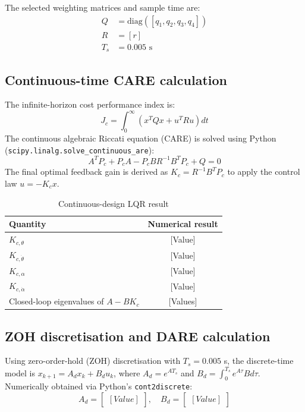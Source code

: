\documentclass[12pt,a4paper]{article}
\begin{document}
The selected weighting matrices and sample time are:
\begin{align*}
    Q &= \text{diag}([q_1, q_2, q_3, q_4]) \\
    R &= [r] \\
    T_s &= 0.005 \text{ s}
\end{align*}

\subsection{Continuous-time CARE calculation}
The infinite-horizon cost performance index is:
\begin{equation}
    J_c = \int_0^\infty (x^T Q x + u^T R u) dt
\end{equation}
The continuous algebraic Riccati equation (CARE) is solved using Python (\texttt{scipy.linalg.solve\_continuous\_are}):
\begin{equation}
    A^T P_c + P_c A - P_c B R^{-1} B^T P_c + Q = 0
\end{equation}
The final optimal feedback gain is derived as $K_c = R^{-1} B^T P_c$ to apply the control law $u = -K_c x$.

\begin{table}[h!]
    \centering
    \caption{Continuous-design LQR result}
    \begin{tabular}{lc}
        \toprule
        \textbf{Quantity} & \textbf{Numerical result} \\
        \midrule
        $K_{c,\theta}$ & [Value] \\
        $K_{c,\dot{\theta}}$ & [Value] \\
        $K_{c,\alpha}$ & [Value] \\
        $K_{c,\dot{\alpha}}$ & [Value] \\
        Closed-loop eigenvalues of $A - BK_c$ & [Values] \\
        \bottomrule
    \end{tabular}
\end{table}

\subsection{ZOH discretisation and DARE calculation}
Using zero-order-hold (ZOH) discretisation with $T_s = 0.005$ s, the discrete-time model is $x_{k+1} = A_d x_k + B_d u_k$, where $A_d = e^{AT_s}$ and $B_d = \int_0^{T_s} e^{A\tau} B d\tau$. Numerically obtained via Python's \texttt{cont2discrete}:
\begin{equation}
    A_d = \begin{bmatrix} [Value] \end{bmatrix}, \quad B_d = \begin{bmatrix} [Value] \end{bmatrix}
\end{equation}
\end{document}
